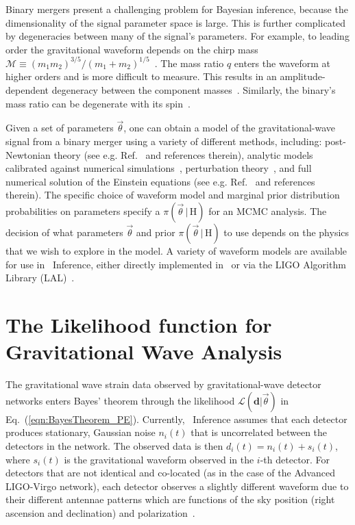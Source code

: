 Binary mergers present a challenging problem for Bayesian inference, because the
dimensionality of the signal parameter space is large. This is further
complicated by degeneracies between many of the signal's parameters. For example, to
leading order the gravitational waveform depends on the chirp mass
$\mathcal{M} \equiv (m_1 m_2)^{3/5} / (m_1 + m_2)^{1/5}$~\cite{Peters:1963ux}.
The mass ratio $q$ enters the waveform at
higher orders and is more difficult to measure. This results in an
amplitude-dependent degeneracy between the component
masses~\cite{Christensen:2001cr}. Similarly, the binary's mass ratio can be
degenerate with its spin~\cite{Hannam:2013uu}.

Given a set of parameters $\vec{\theta}$, one can obtain a model of the
gravitational-wave signal from a binary merger using a variety of different
methods, including: post-Newtonian theory (see e.g. Ref.~\cite{Blanchet2006}
and references therein), analytic models calibrated against numerical
simulations~\cite{Buonanno:1998gg,Buonanno:2000ef,Damour:2000we,Damour:2001tu,Ajith:2007qp,Ajith:2009bn,Santamaria:2010yb},
perturbation theory~\cite{Teukolsky:1972my,Berti:2009kk}, and full numerical
solution of the Einstein equations (see e.g. Ref.~\cite{Cardoso:2014uka} and
references therein). The specific choice of waveform model and marginal prior distribution probabilities
on parameters specify a $\pi(\vec{\theta} \, | \, \mathrm{H})$ for an MCMC analysis.
The decision of what parameters $\vec{\theta}$ and prior $\pi(\vec{\theta} \, | \, \mathrm{H})$ 
to use depends on the
physics that we wish to explore in the model. A variety of waveform models are available
for use in \pycbc{}\ Inference, either directly implemented in \pycbc{}\ or via 
the LIGO Algorithm Library (LAL)~\cite{lal}.

\section{The Likelihood function for Gravitational Wave Analysis}
The gravitational wave strain data observed by gravitational-wave detector networks
enters Bayes' theorem through the likelihood $\mathcal{L}(\mathbf{d} | \vec{\theta})$
 in Eq.~(\ref{eqn:BayesTheorem_PE}).
Currently, \pycbc{}\ Inference assumes that each detector produces stationary,
Gaussian noise $n_{i}(t)$ that is uncorrelated between the detectors in the
network. The observed data is then $d_{i}(t) = n_{i}(t) + s_{i}(t)$, where
$s_i(t)$ is the gravitational waveform observed in the $i$-th detector.  For
detectors that are not identical and co-located (as in the case of the Advanced LIGO-Virgo network), each detector observes a slightly different waveform due to their different antennae patterns which are functions of the sky position (right ascension and declination) and polarization~\cite{Wahlquist:1987rx}.

